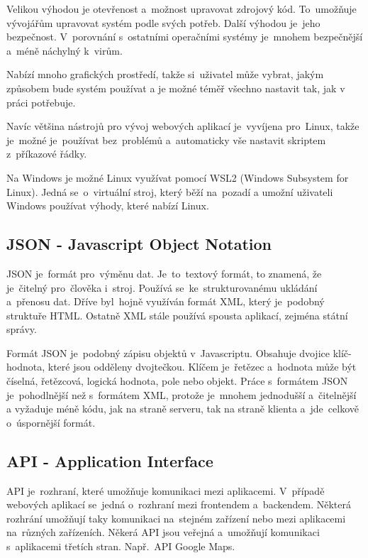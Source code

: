 \documentclass[14pt,a4paper]{article}
\begin{document}
        Velikou výhodou je otevřenost a~možnost upravovat zdrojový kód. To~umožňuje vývojářům upravovat systém podle svých potřeb.
        Další výhodou je~jeho bezpečnost. V~porovnání s~ostatními operačními systémy je~mnohem bezpečnější a~méně náchylný k~virům.

        Nabízí mnoho grafických prostředí, takže si~uživatel může vybrat, jakým způsobem bude systém používat a je možné téměř
        všechno nastavit tak, jak v práci potřebuje.

        Navíc většina nástrojů pro vývoj webových aplikací je~vyvíjena pro~Linux, takže je~možné je~používat bez~problémů a~automaticky
        vše nastavit skriptem z~příkazové řádky.

        Na Windows je možné Linux využívat pomocí WSL2 (Windows Subsystem for Linux). Jedná se~o~virtuální stroj, který běží na~pozadí
        a umožní uživateli Windows používat výhody, které nabízí Linux.

        \subsection{JSON - Javascript Object Notation}
        JSON je~formát pro~výměnu dat. Je~to~textový formát, to znamená, že je~čitelný pro~člověka i~stroj.
        Používá se~ke~strukturovanému ukládání a~přenosu dat. Dříve byl~hojně využíván formát XML,
        který je~podobný struktuře HTML. Ostatně XML stále používá spousta aplikací, zejména státní správy.

        Formát JSON je~podobný zápisu objektů v~Javascriptu. Obsahuje dvojice klíč-hodnota, které jsou odděleny dvojtečkou.
        Klíčem je~řetězec a~hodnota může být číselná, řetězcová, logická hodnota, pole nebo objekt.
        Práce s~formátem JSON je~pohodlnější než s~formátem XML, protože je~mnohem jednodušší a~čitelnější a vyžaduje méně kódu,
        jak na straně serveru, tak na straně klienta a~jde~celkově o~úspornější formát.

        \subsection{API - Application Interface}
        API je~rozhraní, které umožňuje komunikaci mezi aplikacemi. V~případě webových aplikací se~jedná o~rozhraní mezi frontendem a~backendem.
        Některá rozhrání umožňují taky komunikaci na~stejném zařízení nebo mezi aplikacemi na~různých zařízeních.
        Někerá API jsou veřejná a~umožňují komunikaci s~aplikacemi třetích stran. Např.~API Google Maps.
\end{document}
